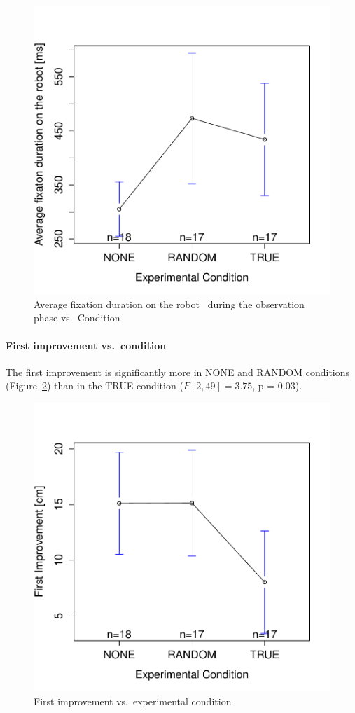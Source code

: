 \documentclass{sig-alternate}
\begin{document}
\begin{figure}[h!]
    \centering
    \includegraphics[width=0.8\linewidth]{meanPlotFixRobo}
    \caption{Average fixation duration on the robot ~during the observation phase
    vs.~Condition}
    \label{res1}
\end{figure}

\paragraph{First improvement vs.~condition}

The first improvement is significantly more in {\sf NONE} and {\sf RANDOM}
conditions (Figure~\ref{res2}) than in the {\sf TRUE} condition ($F[2,49]=3.75$, p =
0.03).

\begin{figure}[h!]
    \centering
    \includegraphics[width=0.8\linewidth]{meanPlotFirstImprove}
    \caption{First improvement vs.~experimental condition}
    \label{res2}
\end{figure}
\end{document}

